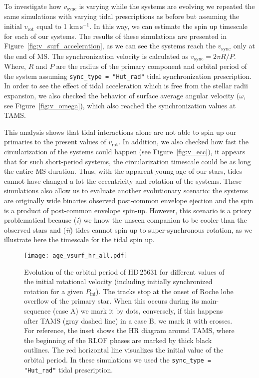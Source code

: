 \documentclass{aa}
\newcommand{\kms}{$\mathrm{km\,s^{-1}}$}
\DeclareRobustCommand{\Figref}[1]{Figure~\ref{#1}}
\begin{document}
To investigate how $v_\mathrm{sync}$ is varying while the systems are evolving we repeated the same simulations with varying tidal
 prescriptions as before but assuming the initial $v_\mathrm{rot}$ equal to 1 \kms.
In this way, we can estimate the spin up timescale for each of our systems.
The results of these simulations are presented in \Figref{fig:v_surf_acceleration}, as we can see the systems reach the $v_\mathrm{sync}$ only at the end of MS.
The synchronization velocity is calculated as $v_\mathrm{sync} = 2  \pi  R / P $. Where, $R$ and $P$ are the radius of the primary component and orbital period of the system assuming \texttt{sync\_type = "Hut\_rad"} tidal synchronization prescription.
In order to see the effect of tidal acceleration which is free from the stellar radii expansion, we also checked the behavior of surface average angular velocity ($\omega$, see \Figref{fig:v_omega}), which also reached the synchronization values at TAMS.

This analysis shows that tidal interactions alone are not able to spin up our primaries to the present values of $v_\mathrm{rot}$.
In addition, we also checked how fast the circularization of the systems could happen (see \Figref{fig:v_ecc}), it appears that for such short-period systems, the circularization timescale could be as long the entire MS duration.
Thus, with the apparent young age of our stars, tides cannot have changed a lot the eccentricity and rotation of the systems.
These simulations also allow us to evaluate another evolutionary scenario: the systems are originally wide binaries observed post-common envelope ejection and the spin is a product of post-common envelope spin-up.
However, this scenario is a priory problematical because (\emph{i}) we know the unseen companion to be cooler than the observed stars and (\emph{ii}) tides cannot spin up to super-synchronous rotation, as we illustrate here the timescale for the tidal spin up.



\begin{figure}[!htbp]
  \centering
  \texttt{[image: age\_vsurf\_hr\_all.pdf]}
  \caption{Evolution of the orbital period of HD\,25631 for different
    values of the initial rotational velocity (including initially synchronized rotation for a given $P_\mathrm{ini}$). The tracks stop at the
    onset of Roche lobe overflow of the primary star. When
      this occurs during its main-sequence (case A) we mark it by
      dots, conversely, if this happens after TAMS (gray dashed line)
      in a case B, we mark it with crosses. For reference, the inset shows the HR diagram around
    TAMS, where the beginning of the RLOF phases are marked by
      thick black outlines. The red horizontal line visualizes the initial value of the orbital period. In these simulations we used the \texttt{sync\_type = "Hut\_rad"} tidal prescription.}
  \label{fig:v_surf_hr}
\end{figure}
\end{document}
